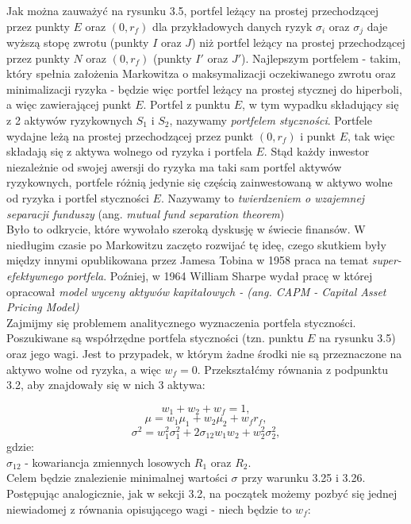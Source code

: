 \documentclass[magister]{dyplom}
\begin{document}
Jak można zauważyć na rysunku 3.5, portfel leżący na prostej przechodzącej przez punkty $E$ oraz $(0, r_f)$ dla przykładowych danych ryzyk $\sigma_i$ oraz $\sigma_j$ daje wyższą stopę zwrotu (punkty $I$ oraz $J$) niż portfel leżący na prostej przechodzącej przez punkty $N$ oraz $(0, r_f)$ (punkty $I'$ oraz $J'$). Najlepszym portfelem - takim, który spełnia założenia Markowitza o maksymalizacji oczekiwanego zwrotu oraz minimalizacji ryzyka - będzie więc portfel leżący na prostej stycznej do hiperboli, a więc zawierającej punkt $E$. Portfel z punktu $E$, w tym wypadku składujący się z 2 aktywów ryzykownych $S_1$ i $S_2$, nazywamy \textit{portfelem styczności}. Portfele wydajne leżą na prostej przechodzącej przez punkt $(0,r_f)$ i punkt $E$, tak więc składają się z aktywa wolnego od ryzyka i portfela $E$. Stąd każdy inwestor niezależnie od swojej awersji do ryzyka ma taki sam portfel aktywów ryzykownych, portfele różnią jedynie się częścią zainwestowaną w aktywo wolne od ryzyka i portfel styczności $E$. Nazywamy to \textit{twierdzeniem o wzajemnej separacji funduszy} (ang. \textit{mutual fund separation theorem})\\ 

Było to odkrycie, które wywołało szeroką dyskusję w świecie finansów. W niedługim czasie po Markowitzu zaczęto rozwijać tę ideę, czego skutkiem były między innymi opublikowana przez Jamesa Tobina w 1958 praca na temat \textit{super-efektywnego portfela}. Poźniej, w 1964 William Sharpe wydał pracę w której opracował \textit{model wyceny aktywów kapitałowych - (ang. CAPM - Capital Asset Pricing Model)}\cite{holton}\\

Zajmijmy się problemem analitycznego wyznaczenia portfela styczności. Poszukiwane są współrzędne portfela styczności (tzn. punktu $E$ na rysunku 3.5) oraz jego wagi. Jest to przypadek, w którym żadne środki nie są przeznaczone na aktywo wolne od ryzyka, a więc $w_f = 0$. Przekształćmy równania z podpunktu 3.2, aby znajdowały się w nich 3 aktywa: 

\begin{equation}
	w_1 + w_2 + w_f = 1,
\end{equation}
\begin{equation}
	\mu = w_1\mu_1 + w_2\mu_2 + w_fr_f,
\end{equation}
\begin{equation}
	\sigma^2 = w_1^2\sigma_1^2 + 2\sigma_{12}w_1w_2 + w_2^2\sigma_2^2,
\end{equation}
gdzie:\\
$\sigma_{12}$ - kowariancja zmiennych losowych $R_1$ oraz $R_2$.\\
Celem będzie znalezienie minimalnej wartości $\sigma$ przy warunku 3.25 i 3.26. Postępując analogicznie, jak w sekcji 3.2, na początek możemy pozbyć się jednej niewiadomej z równania opisującego wagi - niech będzie to $w_f$:
\end{document}
